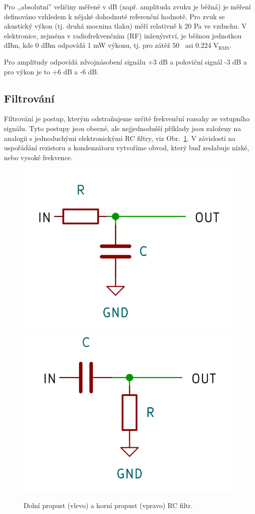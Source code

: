 Pro ,,absolutní'' veličiny měřené v dB (např. amplituda zvuku je běžná) je měření definováno vzhledem k nějaké dohodnuté referenční hodnotě. Pro zvuk se akustický výkon (tj. druhá mocnina tlaku) měří relativně k 20 \textmu Pa ve vzduchu. V elektronice, zejména v radiofrekvenčním (RF) inženýrství, je běžnou jednotkou dBm, kde 0 dBm odpovídá 1 mW výkonu, tj. pro zátěž 50 \textohm~asi 0.224 V$_\mathrm{RMS}$.

Pro amplitudy odpovídá zdvojnásobení signálu +3 dB a poloviční signál -3 dB a pro výkon je to +6 dB a -6 dB.

\subsection{Filtrování}

Filtrování je postup, kterým odstraňujeme určité frekvenční rozsahy ze vstupního signálu. Tyto postupy jsou obecné, ale nejjednodušší příklady jsou založeny na analogii s jednoduchými elektronickými RC filtry, viz Obr.~\ref{fig:RC-lowpass}. V závislosti na uspořádání rezistoru a kondenzátoru vytvoříme obvod, který buď zeslabuje nízké, nebo vysoké frekvence.
\begin{figure}
    \centering
    \includegraphics[width=0.49\linewidth]{low-pass-RC.png}%
    \includegraphics[width=0.49\linewidth]{high-pass-RC.png}%
    \label{fig:RC-lowpass}
    \caption{Dolní propust (vlevo) a horní propust (vpravo) RC filtr.}
\end{figure}

